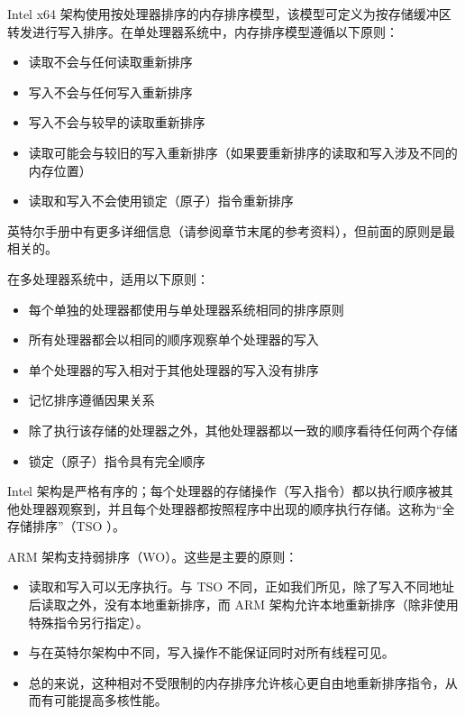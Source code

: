 Intel x64 架构使用按处理器排序的内存排序模型，该模型可定义为按存储缓冲区转发进行写入排序。在单处理器系统中，内存排序模型遵循以下原则：

\begin{itemize}
\item
读取不会与任何读取重新排序

\item
写入不会与任何写入重新排序

\item
写入不会与较早的读取重新排序

\item
读取可能会与较旧的写入重新排序（如果要重新排序的读取和写入涉及不同的内存位置）

\item
读取和写入不会使用锁定（原子）指令重新排序
\end{itemize}

英特尔手册中有更多详细信息（请参阅章节末尾的参考资料），但前面的原则是最相关的。

在多处理器系统中，适用以下原则：

\begin{itemize}
\item
每个单独的处理器都使用与单处理器系统相同的排序原则

\item
所有处理器都会以相同的顺序观察单个处理器的写入

\item
单个处理器的写入相对于其他处理器的写入没有排序

\item
记忆排序遵循因果关系

\item
除了执行该存储的处理器之外，其他处理器都以一致的顺序看待任何两个存储

\item
锁定（原子）指令具有完全顺序
\end{itemize}

Intel 架构是严格有序的；每个处理器的存储操作（写入指令）都以执行顺序被其他处理器观察到，并且每个处理器都按照程序中出现的顺序执行存储。这称为“全存储排序”（TSO ）。

ARM 架构支持弱排序（WO）。这些是主要的原则：

\begin{itemize}
\item
读取和写入可以无序执行。与 TSO 不同，正如我们所见，除了写入不同地址后读取之外，没有本地重新排序，而 ARM 架构允许本地重新排序（除非使用特殊指令另行指定）。

\item
与在英特尔架构中不同，写入操作不能保证同时对所有线程可见。

\item
总的来说，这种相对不受限制的内存排序允许核心更自由地重新排序指令，从而有可能提高多核性能。
\end{itemize}

